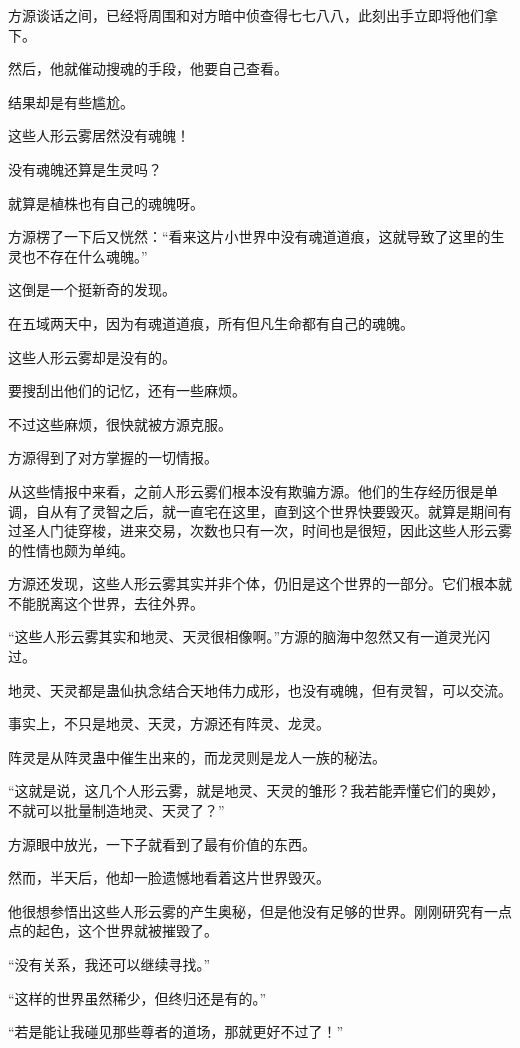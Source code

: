 \begin{this_body}
方源谈话之间，已经将周围和对方暗中侦查得七七八八，此刻出手立即将他们拿下。

然后，他就催动搜魂的手段，他要自己查看。

结果却是有些尴尬。

这些人形云雾居然没有魂魄！

没有魂魄还算是生灵吗？

就算是植株也有自己的魂魄呀。

方源楞了一下后又恍然：“看来这片小世界中没有魂道道痕，这就导致了这里的生灵也不存在什么魂魄。”

这倒是一个挺新奇的发现。

在五域两天中，因为有魂道道痕，所有但凡生命都有自己的魂魄。

这些人形云雾却是没有的。

要搜刮出他们的记忆，还有一些麻烦。

不过这些麻烦，很快就被方源克服。

方源得到了对方掌握的一切情报。

从这些情报中来看，之前人形云雾们根本没有欺骗方源。他们的生存经历很是单调，自从有了灵智之后，就一直宅在这里，直到这个世界快要毁灭。就算是期间有过圣人门徒穿梭，进来交易，次数也只有一次，时间也是很短，因此这些人形云雾的性情也颇为单纯。

方源还发现，这些人形云雾其实并非个体，仍旧是这个世界的一部分。它们根本就不能脱离这个世界，去往外界。

“这些人形云雾其实和地灵、天灵很相像啊。”方源的脑海中忽然又有一道灵光闪过。

地灵、天灵都是蛊仙执念结合天地伟力成形，也没有魂魄，但有灵智，可以交流。

事实上，不只是地灵、天灵，方源还有阵灵、龙灵。

阵灵是从阵灵蛊中催生出来的，而龙灵则是龙人一族的秘法。

“这就是说，这几个人形云雾，就是地灵、天灵的雏形？我若能弄懂它们的奥妙，不就可以批量制造地灵、天灵了？”

方源眼中放光，一下子就看到了最有价值的东西。

然而，半天后，他却一脸遗憾地看着这片世界毁灭。

他很想参悟出这些人形云雾的产生奥秘，但是他没有足够的世界。刚刚研究有一点点的起色，这个世界就被摧毁了。

“没有关系，我还可以继续寻找。”

“这样的世界虽然稀少，但终归还是有的。”

“若是能让我碰见那些尊者的道场，那就更好不过了！”


\end{this_body}
